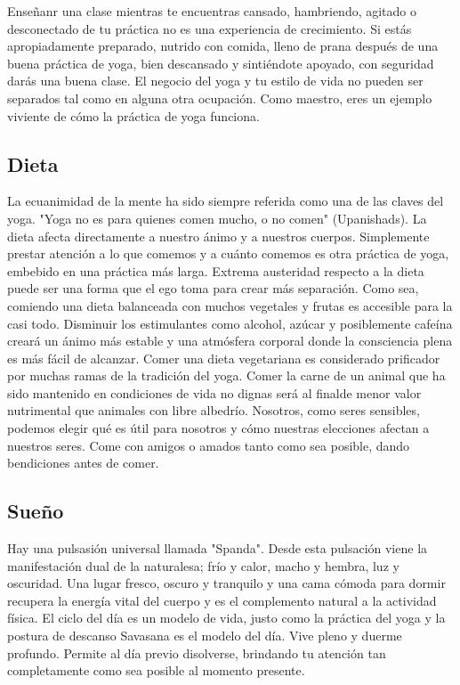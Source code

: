 \begin{itemize}
Enseñanr una clase mientras te encuentras cansado, hambriendo, agitado o desconectado de tu práctica no es una experiencia de crecimiento. Si estás apropiadamente preparado, nutrido con comida, lleno de prana después de una buena práctica de yoga, bien descansado y sintiéndote apoyado, con seguridad darás una buena clase. El negocio del yoga y tu estilo de vida no pueden ser separados tal como en alguna otra ocupación. Como maestro, eres un ejemplo viviente de cómo la práctica de yoga funciona.

\subsection{Dieta}
La ecuanimidad de la mente ha sido siempre referida como una de las claves del yoga. "Yoga no es para quienes comen mucho, o no comen" (Upanishads). La dieta afecta directamente a nuestro ánimo y a nuestros cuerpos. Simplemente prestar atención a lo que comemos y a cuánto comemos es otra práctica de yoga, embebido en una práctica más larga. Extrema austeridad respecto a la dieta puede ser una forma que el ego toma para crear más separación. Como sea, comiendo una dieta balanceada con muchos vegetales y frutas es accesible para la casi todo. Disminuir los estimulantes como alcohol, azúcar y posiblemente cafeína creará un ánimo más estable y una atmósfera corporal donde la consciencia plena es más fácil de alcanzar. Comer una dieta vegetariana es considerado prificador por muchas ramas de la tradición del yoga. Comer la carne de un animal que ha sido mantenido en condiciones de vida no dignas será al finalde menor valor nutrimental que animales con libre albedrío. Nosotros, como seres sensibles, podemos elegir qué es útil para nosotros y cómo nuestras elecciones afectan a nuestros seres. Come con amigos o amados tanto como sea posible, dando bendiciones antes de comer.

\subsection{Sueño}
Hay una pulsasión universal llamada "Spanda". Desde esta pulsación viene la manifestación dual de la naturalesa; frío y calor, macho y hembra, luz y oscuridad. Una lugar fresco, oscuro y tranquilo y una cama cómoda para dormir recupera la energía vital del cuerpo y es el complemento natural a la actividad física. El ciclo del día es un modelo de vida, justo como la práctica del yoga y la postura de descanso Savasana es el modelo del día. Vive pleno y duerme profundo. Permite al día previo disolverse, brindando tu atención tan completamente como sea posible al momento presente.


\end{itemize}
